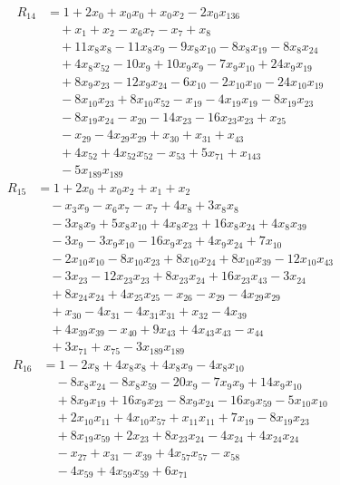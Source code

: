 \begin{align*}
R_{14}&={}1 +2x_{0} +x_{0}x_{0} +x_{0}x_{2} -2x_{0}x_{136}\\
&\quad{}+x_{1} +x_{2} -x_{6}x_{7} -x_{7} +x_{8}\\
&\quad{}+11x_{8}x_{8} -11x_{8}x_{9} -9x_{8}x_{10} -8x_{8}x_{19} -8x_{8}x_{24}\\
&\quad{}+4x_{8}x_{52} -10x_{9} +10x_{9}x_{9} -7x_{9}x_{10} +24x_{9}x_{19}\\
&\quad{}+8x_{9}x_{23} -12x_{9}x_{24} -6x_{10} -2x_{10}x_{10} -24x_{10}x_{19}\\
&\quad{}-8x_{10}x_{23} +8x_{10}x_{52} -x_{19} -4x_{19}x_{19} -8x_{19}x_{23}\\
&\quad{}-8x_{19}x_{24} -x_{20} -14x_{23} -16x_{23}x_{23} +x_{25}\\
&\quad{}-x_{29} -4x_{29}x_{29} +x_{30} +x_{31} +x_{43}\\
&\quad{}+4x_{52} +4x_{52}x_{52} -x_{53} +5x_{71} +x_{143}\\
&\quad{}-5x_{189}x_{189}
\end{align*}
\begin{align*}
R_{15}&={}1 +2x_{0} +x_{0}x_{2} +x_{1} +x_{2}\\
&\quad{}-x_{3}x_{9} -x_{6}x_{7} -x_{7} +4x_{8} +3x_{8}x_{8}\\
&\quad{}-3x_{8}x_{9} +5x_{8}x_{10} +4x_{8}x_{23} +16x_{8}x_{24} +4x_{8}x_{39}\\
&\quad{}-3x_{9} -3x_{9}x_{10} -16x_{9}x_{23} +4x_{9}x_{24} +7x_{10}\\
&\quad{}-2x_{10}x_{10} -8x_{10}x_{23} +8x_{10}x_{24} +8x_{10}x_{39} -12x_{10}x_{43}\\
&\quad{}-3x_{23} -12x_{23}x_{23} +8x_{23}x_{24} +16x_{23}x_{43} -3x_{24}\\
&\quad{}+8x_{24}x_{24} +4x_{25}x_{25} -x_{26} -x_{29} -4x_{29}x_{29}\\
&\quad{}+x_{30} -4x_{31} -4x_{31}x_{31} +x_{32} -4x_{39}\\
&\quad{}+4x_{39}x_{39} -x_{40} +9x_{43} +4x_{43}x_{43} -x_{44}\\
&\quad{}+3x_{71} +x_{75} -3x_{189}x_{189}
\end{align*}
\begin{align*}
R_{16}&={}1 -2x_{8} +4x_{8}x_{8} +4x_{8}x_{9} -4x_{8}x_{10}\\
&\quad{}-8x_{8}x_{24} -8x_{8}x_{59} -20x_{9} -7x_{9}x_{9} +14x_{9}x_{10}\\
&\quad{}+8x_{9}x_{19} +16x_{9}x_{23} -8x_{9}x_{24} -16x_{9}x_{59} -5x_{10}x_{10}\\
&\quad{}+2x_{10}x_{11} +4x_{10}x_{57} +x_{11}x_{11} +7x_{19} -8x_{19}x_{23}\\
&\quad{}+8x_{19}x_{59} +2x_{23} +8x_{23}x_{24} -4x_{24} +4x_{24}x_{24}\\
&\quad{}-x_{27} +x_{31} -x_{39} +4x_{57}x_{57} -x_{58}\\
&\quad{}-4x_{59} +4x_{59}x_{59} +6x_{71}
\end{align*}
